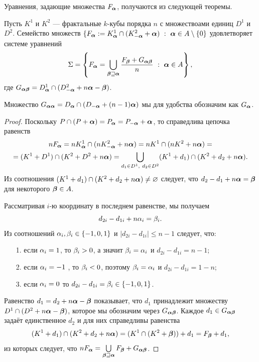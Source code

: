 Уравнения, задающие множества $F_{\bm{\alpha}}$, получаются из следующей теоремы.

\begin{theorem}\label{IFC}
Пусть $K^1$ и $K^2$ --- фрактальные $k$-кубы порядка $n$ с множествоами единиц $D^1$ и $D^2$.
Семейство множеств $\{F_\bma:=K^1_{\bma}\cap(K^2_{-\bma}+\bma)\ :\ \bma\in A\mmm\{0\}$ удовлетворяет системе уравнений
\begin{equation}\label{sideint}
\Sigma=\left\{
F_{\bm{\alpha}}=\bigcup\limits_{{\bm{\beta}}\sqsupseteq{\bm{\alpha}}} \dfrac{F_{\bm{\beta}}+G_{{\bm{\alpha}}{\bm{\beta}}}}{n}\ :\ {\bm{\alpha}}\in A\right\},
\end{equation}
где $G_{{\bm{\alpha}}{\bm{\beta}}}=D^1_{\bm{\alpha}}\cap(D^2_{-{\bm{\alpha}}}+n{\bm{\alpha}}-{\bm{\beta}})$.
\end{theorem}

Множество $G_{{\bm{\alpha}}{\bm{\alpha}}}=D_{\bm{\alpha}}\cap(D_{-{\bm{\alpha}}}+(n-1){\bm{\alpha}})$ мы для удобства обозначим как $G_{{\bm{\alpha}}}$.

\begin{proof}
Поскольку $P\cap (P+{\bm{\alpha}})=P_{\bm{\alpha}}=P_{-{\bm{\alpha}}}+{\bm{\alpha}}$, то справедлива цепочка равенств
\begin{multline}\label{line}
nF_{\bm{\alpha}}=nK^1_{\bm{\alpha}}\cap (nK^2_{-{\bm{\alpha}}}+n{\bm{\alpha}})=nK^1\cap(nK^2+n{\bm{\alpha}})=\\
=(K^1+D^1)\cap(K^2+D^2+n{\bm{\alpha}})=
\bigcup\limits_{d_1\in D^1,\ d_2\in D^2}(K^1+d_1)\cap (K^2+d_2+n{\bm{\alpha}}).
\end{multline}
Из соотношения $(K^1+d_1)\cap (K^2+d_2+n{\bm{\alpha}})\neq\varnothing$ следует, что $d_2-d_1+n{\bm{\alpha}}={\bm{\beta}}$ для некоторого ${\bm{\beta}}\in A$.

Рассматривая $i$-ю координату в последнем равенстве, мы получаем
$$d_{2i}-d_{1i}+n\alpha_i=\beta_i.$$ 
Из соотношений $\alpha_i,\beta_i\in\{-1,0,1\}$ и $|d_{2i}-d_{1i}|\le n-1$ следует, что: \medskip
\begin{itemize}[nolistsep]
 \item[1.] если $\alpha_i=1$, то $\beta_i>0$, а значит $\beta_i=\alpha_i$ и $d_{2i}-d_{1i}=n-1$;
 \item[2.] если $\alpha_i=-1$ , то $\beta_i<0$, поэтому $\beta_i=\alpha_i$ и $d_{2i}-d_{1i}=1-n$;
 \item[3.] если $\alpha_i=0$ то $d_{2i}-d_{1i}=\beta_i\in\{-1,0,1\}$.
\end{itemize} 
\medskip

Равенство $d_1=d_2+n{\bm{\alpha}}-{\bm{\beta}}$ показывает, что $d_1$ принадлежит множеству $D^1\cap(D^2+n{\bm{\alpha}}-{\bm{\beta}})$, которое мы обозначим через $G_{{\bm{\alpha}}{\bm{\beta}}}$.
Каждое $d_1\in G_{{\bm{\alpha}}{\bm{\beta}}}$ задаёт единственное $d_2$ и для них справедливы равенства 
$$(K^1+d_1)\cap (K^2+d_2+n{\bm{\alpha}})= (K^1\cap(K^2+{\bm{\beta}}))+d_1= F_{\bm{\beta}}+d_1,$$ 
из которых следует, что $nF_{\bm{\alpha}}= \bigcup\limits_{{\bm{\beta}}\sqsupseteq{\bm{\alpha}}} {F_{\bm{\beta}}+G_{{\bm{\alpha}}{\bm{\beta}}}}$.
\end{proof}

